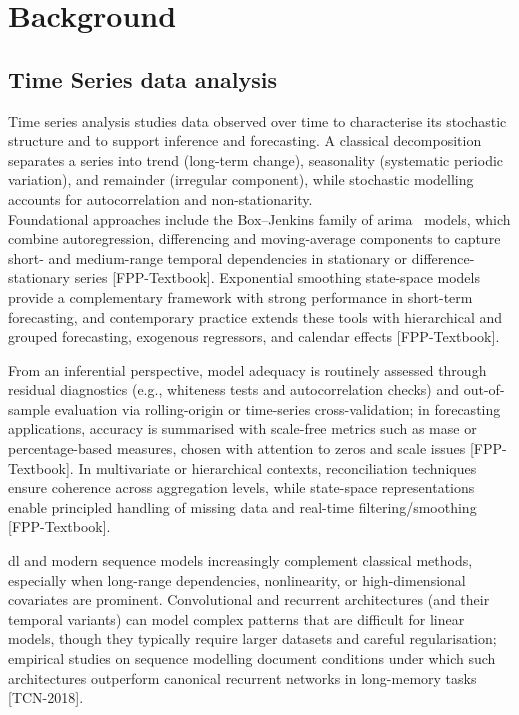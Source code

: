 \section{Background}

\subsection{Time Series data analysis}

Time series analysis studies data observed over time to characterise its stochastic structure and to support inference and forecasting. A classical decomposition separates a series into trend (long-term change), seasonality (systematic periodic variation), and remainder (irregular component), while stochastic modelling accounts for autocorrelation and non-stationarity.\\

Foundational approaches include the Box–Jenkins family of \acrfull{arima} \ models, which combine autoregression, differencing and moving-average components to capture short- and medium-range temporal dependencies in stationary or difference-stationary series [FPP-Textbook]. Exponential smoothing state-space models provide a complementary framework with strong performance in short-term forecasting, and contemporary practice extends these tools with hierarchical and grouped forecasting, exogenous regressors, and calendar effects [FPP-Textbook].

From an inferential perspective, model adequacy is routinely assessed through residual diagnostics (e.g., whiteness tests and autocorrelation checks) and out-of-sample evaluation via rolling-origin or time-series cross-validation; in forecasting applications, accuracy is summarised with scale-free metrics such as \acrfull{mase} or percentage-based measures, chosen with attention to zeros and scale issues [FPP-Textbook]. In multivariate or hierarchical contexts, reconciliation techniques ensure coherence across aggregation levels, while state-space representations enable principled handling of missing data and real-time filtering/smoothing [FPP-Textbook].

\acrfull{dl} and modern sequence models increasingly complement classical methods, especially when long-range dependencies, nonlinearity, or high-dimensional covariates are prominent. Convolutional and recurrent architectures (and their temporal variants) can model complex patterns that are difficult for linear models, though they typically require larger datasets and careful regularisation; empirical studies on sequence modelling document conditions under which such architectures outperform canonical recurrent networks in long-memory tasks [TCN-2018].


